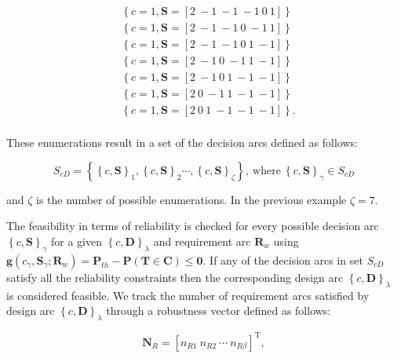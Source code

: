 \begin{equation*}
	\begin{aligned}
		& \left\{c = 1,\mathbf{S} = \left[2 ~ -1 ~ -1 ~ -1 ~ 0 ~ 1\right]\right\}\\
		& \left\{c = 1,\mathbf{S} = \left[2 ~ -1 ~ -1 ~ 0 ~ -1 ~ 1\right]\right\}\\
		& \left\{c = 1,\mathbf{S} = \left[2 ~ -1 ~ -1 ~ 0 ~ 1 ~ -1\right]\right\}\\
		& \left\{c = 1,\mathbf{S} = \left[2 ~ -1 ~ 0 ~ -1 ~ 1 ~ -1\right]\right\}\\
		& \left\{c = 1,\mathbf{S} = \left[2 ~ -1 ~ 0 ~ 1 ~ -1 ~ -1\right]\right\}\\
		& \left\{c = 1,\mathbf{S} = \left[2 ~ 0 ~ -1 ~ 1 ~ -1 ~ -1\right]\right\}\\
		& \left\{c = 1,\mathbf{S} = \left[2 ~ 0 ~ 1 ~ -1 ~ -1 ~ -1\right]\right\}.\\
	\end{aligned}
\end{equation*}

These enumerations result in a set of the decision arcs defined as follows:

\begin{equation} \label{eq:enumeratedcS}
	S_{cD} = \left\{\left\{c,\mathbf{S}\right\}_{1},\left\{c,\mathbf{S}\right\}_{2}\cdots,\left\{c,\mathbf{S}\right\}_{\zeta}\right\},\mathrm{~where~} \left\{c,\mathbf{S}\right\}_{\gamma} \in S_{cD}
\end{equation}

and $\zeta$ is the number of possible enumerations. In the previous example $\zeta = 7$.

The feasibility in terms of reliability is checked for every possible decision arc $\left\{c,\mathbf{S}\right\}_{\gamma}$ for a given $\left\{c,\mathbf{D}\right\}_\lambda$ and requirement arc $\mathbf{R}_w$ using $\mathbf{g}(c_{\gamma},\mathbf{S}_{\gamma};\mathbf{R}_w) = \mathbf{P}_{th} - \mathbf{P}(\mathbf{T} \in \mathbf{C}) \le \mathbf{0}$. If any of the decision arcs in set $S_{cD}$ satisfy all the reliability constraints then the corresponding design arc $\left\{c,\mathbf{D}\right\}_\lambda$ is considered feasible. We track the number of requirement arcs satisfied by design arc $\left\{c,\mathbf{D}\right\}_\lambda$ through a robustness vector defined as follows:

\begin{equation} \label{eq:robustnessvec}
	\mathbf{N}_R = \left[n_{R1} ~ n_{R2} ~ \cdots ~ n_{R\beta}\right]^{\mathrm{T}},
\end{equation}

